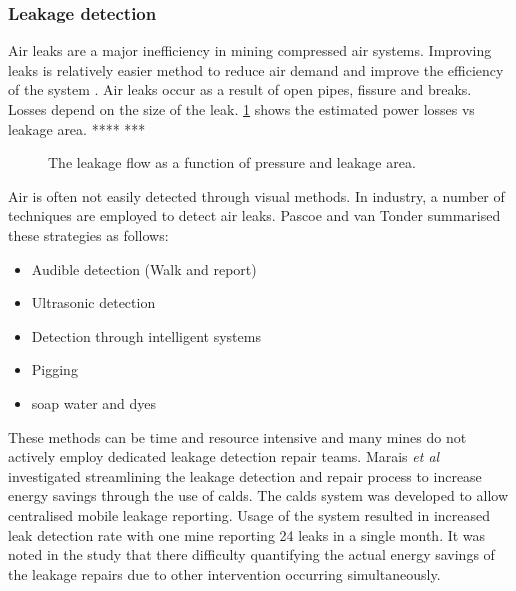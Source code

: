 		 \subsubsection{Leakage detection}
		 Air leaks are a major inefficiency in mining compressed air systems. Improving leaks is relatively easier method to  reduce air demand and improve the efficiency of the system  \cite{van2011sustaining}. Air leaks occur as a result of open pipes, fissure and breaks. Losses depend on the size of the leak. \cref{fig: Leak losses} shows the estimated power losses vs leakage area. **** \cite{van2011sustaining} ***
		 \begin{figure}[h]
		 	\centering
		 	
		 	\caption[The leakage flow as a function of pressure and leakage area.]{ The leakage flow as a function of pressure and leakage area.}
		 	\label{fig: Leak losses}
		 \end{figure}
	 \par 
		 Air is often not easily detected through visual methods. In industry, a number of techniques are employed to detect air leaks. Pascoe \cite{Pascoe2016Masters} and van Tonder \cite{vanTonder2010Masters} summarised these strategies as follows:
		 \begin{itemize}
		 	\item Audible detection (Walk and report)
		 	\item Ultrasonic detection
		 	\item Detection through intelligent systems
		 	\item Pigging
		 	\item soap water and dyes
		 \end{itemize}
	 	 These methods can be time and resource intensive and many mines do not actively employ dedicated leakage detection repair teams. Marais \textit{et al} \cite{marais2009increased} investigated streamlining the leakage detection and repair process to increase energy savings through the use of \gls{calds}. The \gls{calds} system was developed to allow centralised mobile leakage reporting. Usage of the system resulted in increased leak detection rate with one mine reporting 24 leaks in a single month. It was noted in the study that there difficulty quantifying the actual energy savings of the leakage repairs due to other intervention occurring simultaneously.	
		 
